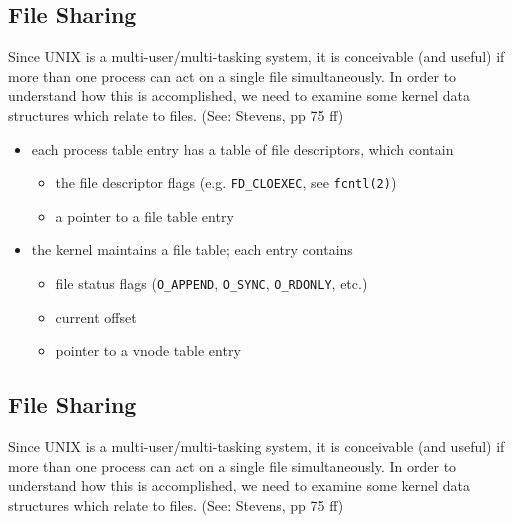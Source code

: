 \documentclass[xga]{xdvislides}
\begin{document}
\subsection{File Sharing}
Since UNIX is a multi-user/multi-tasking system, it is conceivable (and
useful) if more than one process can act on a single file simultaneously. In
order to understand how this is accomplished, we need to examine some kernel
data structures which relate to files.  (See: Stevens, pp 75 ff)

\begin{itemize}
	\item each process table entry has a table of file descriptors, which contain
		\begin{itemize}
			\item the file descriptor flags (e.g. {\tt FD\_CLOEXEC}, see \verb+fcntl(2)+)
			\item a pointer to a file table entry
		\end{itemize}
	\item the kernel maintains a file table;  each entry contains
		\begin{itemize}
			\item file status flags (\verb+O_APPEND+, \verb+O_SYNC+, \verb+O_RDONLY+, etc.)
			\item current offset
			\item pointer to a vnode table entry
		\end{itemize}
\end{itemize}

\subsection{File Sharing}
Since UNIX is a multi-user/multi-tasking system, it is conceivable (and useful)
if more than one process can act on a single file simultaneously. In
order to understand how this is accomplished, we need to examine some kernel
data structures which relate to files.  (See: Stevens, pp 75 ff)
\end{document}
